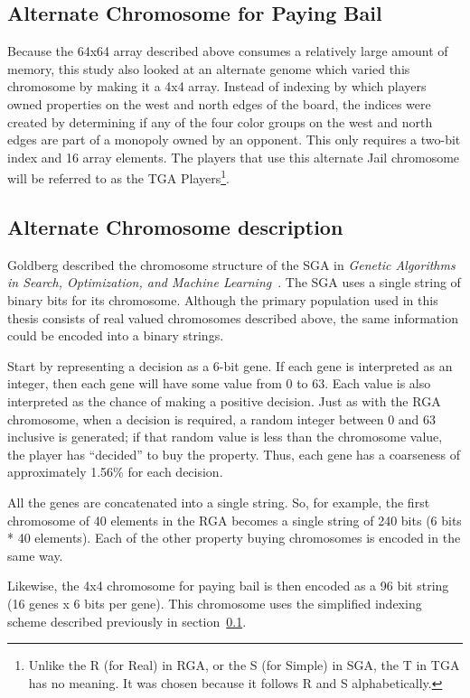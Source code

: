 \subsection{Alternate Chromosome for Paying Bail} \label{5_altjail}

Because the 64x64 array described above consumes a relatively large amount of
memory, this study also looked at an alternate genome which varied this
chromosome by making it a 4x4 array. Instead of indexing by which players owned
properties on the west and north edges of the board, the indices were created by
determining if any of the four color groups on the west and north edges are part
of a monopoly owned by an opponent. This only requires a two-bit index and 16
array elements. The players that use this alternate Jail chromosome will be
referred to as the TGA Players\footnote{Unlike the R (for Real) in RGA, or the S
(for Simple) in SGA, the T in TGA has no meaning. It was chosen because it
follows R and S alphabetically.}.

\subsection{Alternate Chromosome description} \label{5_altchromo}

Goldberg described the chromosome structure of the SGA in \emph{Genetic
Algorithms in Search, Optimization, and Machine
Learning}~\cite{goldberg1989genetic}. The SGA uses a single string of binary
bits for its chromosome. Although the primary population used in this thesis
consists of real valued chromosomes described above, the same information could
be encoded into a binary strings.

Start by representing a decision as a 6-bit gene. If each gene is interpreted as
an integer, then each gene will have some value from 0 to 63. Each value is also
interpreted as the chance of making a positive decision. Just as with the RGA
chromosome, when a decision is required, a random integer between 0 and 63
inclusive is generated; if that random value is less than the chromosome value,
the player has ``decided'' to buy the property. Thus, each gene has a coarseness
of approximately 1.56\% for each decision.

All the genes are concatenated into a single string. So, for example, the first
chromosome of 40 elements in the RGA becomes a single string of 240 bits (6 bits
* 40 elements). Each of the other property buying chromosomes is encoded in the
same way.

Likewise, the 4x4 chromosome for paying bail is then encoded as a 96 bit string
(16 genes x 6 bits per gene). This chromosome uses the simplified indexing
scheme described previously in section~\ref{5_altjail}.

